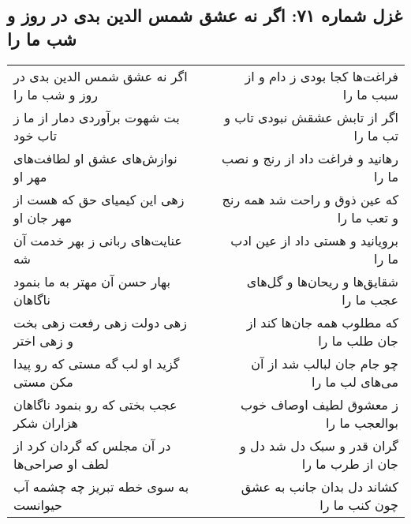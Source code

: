 \begin{center}
\section*{غزل شماره ۷۱: اگر نه عشق شمس الدین بدی در روز و شب ما را}
\label{sec:0071}
\begin{longtable}{l p{0.5cm} r}
اگر نه عشق شمس الدین بدی در روز و شب ما را
&&
فراغت‌ها کجا بودی ز دام و از سبب ما را
\\
بت شهوت برآوردی دمار از ما ز تاب خود
&&
اگر از تابش عشقش نبودی تاب و تب ما را
\\
نوازش‌های عشق او لطافت‌های مهر او
&&
رهانید و فراغت داد از رنج و نصب ما را
\\
زهی این کیمیای حق که هست از مهر جان او
&&
که عین ذوق و راحت شد همه رنج و تعب ما را
\\
عنایت‌های ربانی ز بهر خدمت آن شه
&&
برویانید و هستی داد از عین ادب ما را
\\
بهار حسن آن مهتر به ما بنمود ناگاهان
&&
شقایق‌ها و ریحان‌ها و گل‌های عجب ما را
\\
زهی دولت زهی رفعت زهی بخت و زهی اختر
&&
که مطلوب همه جان‌ها کند از جان طلب ما را
\\
گزید او لب گه مستی که رو پیدا مکن مستی
&&
چو جام جان لبالب شد از آن می‌های لب ما را
\\
عجب بختی که رو بنمود ناگاهان هزاران شکر
&&
ز معشوق لطیف اوصاف خوب بوالعجب ما را
\\
در آن مجلس که گردان کرد از لطف او صراحی‌ها
&&
گران قدر و سبک دل شد دل و جان از طرب ما را
\\
به سوی خطه تبریز چه چشمه آب حیوانست
&&
کشاند دل بدان جانب به عشق چون کنب ما را
\\
\end{longtable}
\end{center}
